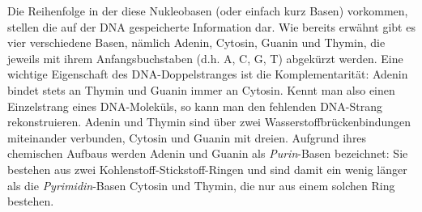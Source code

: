 Die Reihenfolge in der diese Nukleobasen (oder einfach kurz Basen) vorkommen, stellen die auf der DNA gespeicherte Information dar. Wie bereits  erwähnt gibt es vier verschiedene Basen, nämlich Adenin, Cytosin, Guanin und Thymin, die jeweils mit ihrem  Anfangsbuchstaben (d.h. A, C, G, T) abgekürzt werden. Eine wichtige Eigenschaft des DNA-Doppelstranges ist die  Komplementarität: Adenin bindet stets an Thymin und Guanin immer an Cytosin. Kennt man also einen Einzelstrang eines DNA-Moleküls, so kann man den fehlenden DNA-Strang rekonstruieren. Adenin und Thymin sind über zwei Wasserstoffbrückenbindungen miteinander verbunden, Cytosin und Guanin mit dreien. Aufgrund ihres chemischen Aufbaus werden Adenin und Guanin als \emph{Purin}-Basen bezeichnet: Sie bestehen aus zwei Kohlenstoff-Stickstoff-Ringen und sind damit ein wenig länger als die \emph{Pyrimidin}-Basen Cytosin und Thymin, die nur aus einem solchen Ring bestehen.

